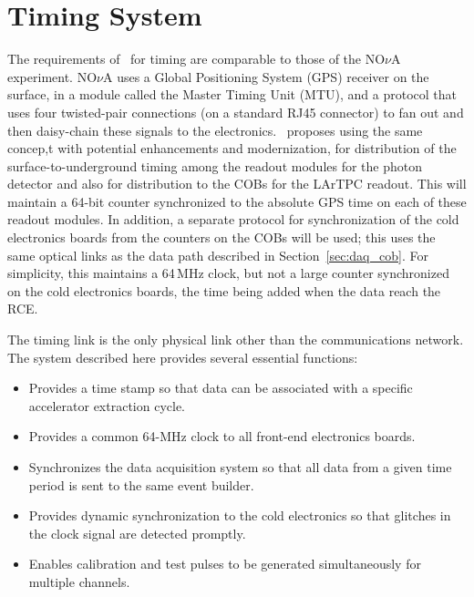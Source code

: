 \section{Timing System }
\label{sec:daq_time}

The  requirements of \LBNE\ for timing are comparable to those of the 
NO$\nu$A experiment.  NO$\nu$A uses a Global Positioning System (GPS)
receiver on the surface, in a module called the Master Timing Unit
(MTU), and a protocol that uses four twisted-pair connections (on a
standard RJ45 connector) to fan out and then daisy-chain these signals
to the electronics.  \LBNE\ proposes using the same concep,t with potential
enhancements and modernization, for distribution of the 
surface-to-underground timing among the readout modules for the photon
detector and also for distribution to the COBs for the LArTPC readout.
This will maintain a 64-bit counter synchronized to the absolute GPS
time on each of these readout modules.  In addition, a
separate protocol for synchronization of the cold electronics
boards from the counters on the COBs will be used; this uses the same optical links
as the data path described in Section~\ref{sec:daq_cob}.  For
simplicity, this  maintains a 64\,MHz clock, but not a large counter
synchronized on the cold electronics boards, the time being added when
the data reach the RCE. 

The timing link is the only physical link other than the
communications network.  The system described here
provides several essential functions: 
\begin{itemize}
\item Provides a time stamp so that data can be associated with a
  specific accelerator extraction cycle.
\item Provides a common 64-MHz clock to all front-end electronics
  boards.
\item Synchronizes the data acquisition system so that all data from a
  given time period is sent to the same event builder.
\item Provides dynamic synchronization to the cold electronics so that
  glitches in the clock signal are detected promptly.
\item Enables calibration and test pulses to be generated
  simultaneously for multiple channels.
\end{itemize}


